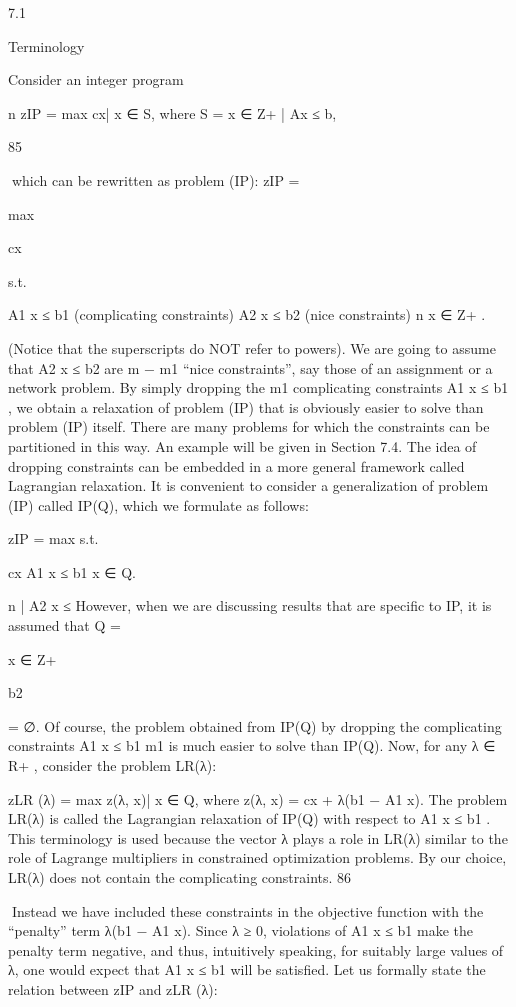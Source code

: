 \documentclass[titlepage]{book}
\theoremstyle{plain}
\theoremstyle{definition}
\theoremstyle{remark}
\begin{document}
7.1

Terminology

Consider an integer program

n
zIP = max {cx| x ∈ S}, where S = {x ∈ Z+
| Ax ≤ b},

85

which can be rewritten as problem (IP):
zIP =

max

cx

s.t.

A1 x ≤ b1 (complicating constraints)
A2 x ≤ b2 (nice constraints)
n
x ∈ Z+
.

(Notice that the superscripts do NOT refer to powers). We are going to assume that A2 x ≤ b2 are
m − m1 “nice constraints”, say those of an assignment or a network problem. By simply dropping the
m1 complicating constraints A1 x ≤ b1 , we obtain a relaxation of problem (IP) that is obviously easier to
solve than problem (IP) itself. There are many problems for which the constraints can be partitioned in
this way. An example will be given in Section 7.4.
The idea of dropping constraints can be embedded in a more general framework called Lagrangian relaxation. It is convenient to consider a generalization of problem (IP) called IP(Q), which we formulate as
follows:

zIP = max
s.t.

cx
A1 x ≤ b1
x ∈ Q.

n
| A2 x ≤
However, when we are discussing results that are specific to IP, it is assumed that Q = {x ∈ Z+

b2 } = ∅. Of course, the problem obtained from IP(Q) by dropping the complicating constraints A1 x ≤ b1
m1
is much easier to solve than IP(Q). Now, for any λ ∈ R+
, consider the problem LR(λ):

zLR (λ) = max {z(λ, x)| x ∈ Q}, where z(λ, x) = cx + λ(b1 − A1 x).
The problem LR(λ) is called the Lagrangian relaxation of IP(Q) with respect to A1 x ≤ b1 . This terminology is used because the vector λ plays a role in LR(λ) similar to the role of Lagrange multipliers in
constrained optimization problems. By our choice, LR(λ) does not contain the complicating constraints.
86

Instead we have included these constraints in the objective function with the “penalty” term λ(b1 − A1 x).
Since λ ≥ 0, violations of A1 x ≤ b1 make the penalty term negative, and thus, intuitively speaking, for
suitably large values of λ, one would expect that A1 x ≤ b1 will be satisfied.
Let us formally state the relation between zIP and zLR (λ):
\end{document}
